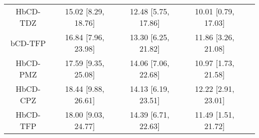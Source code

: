 \documentclass[8pt]{article}
\begin{document}
\begin{center}
\begin{footnotesize}
\begin{longtable}{|ccccc|}
HbCD-TDZ & 15.02 [8.29, 18.76] & 12.48 [5.75, 17.86] & 10.01 [0.79, 17.03] \\
 bCD-TFP & 16.84 [7.96, 23.98] & 13.30 [6.25, 21.82] & 11.86 [3.26, 21.08] \\
HbCD-PMZ & 17.59 [9.35, 25.08] & 14.06 [7.06, 22.68] & 10.97 [1.73, 21.58] \\
HbCD-CPZ & 18.44 [9.88, 26.61] & 14.13 [6.19, 23.51] & 12.22 [2.91, 23.01] \\
HbCD-TFP & 18.00 [9.03, 24.77] & 14.39 [6.71, 22.63] & 11.49 [1.51, 21.72] \\
\end{longtable}
\end{footnotesize}
\end{center}
\end{document}
